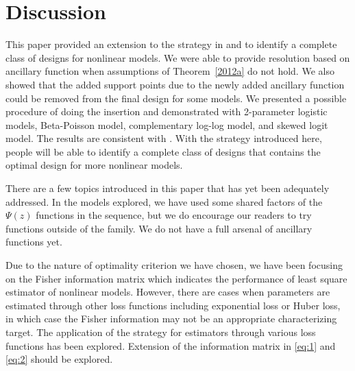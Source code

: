 \documentclass[11pt]{amsart}
\theoremstyle{definition}
\theoremstyle{remark}
\numberwithin{equation}{section}
\begin{document}
    \section{Discussion}
 This paper provided an extension to the strategy in \cite{yang2010} and \cite{yang2012} to identify a complete class of designs for nonlinear models. We were able to provide resolution based on ancillary function when assumptions of Theorem~\ref{2012a} do not hold. We also showed that the added support points due to the newly added ancillary function could be removed from the final design for some models. We presented a possible procedure of doing the insertion and demonstrated with 2-parameter logistic models, Beta-Poisson model, complementary log-log model, and skewed logit model. The results are consistent with \cite{biedermann2006}. With the strategy introduced here, people will be able to identify a complete class of designs that contains the optimal design for more nonlinear models.
 
There are a few topics introduced in this paper that has yet been adequately addressed. In the models explored, we have used some shared factors of the $\Psi(z)$ functions in the sequence, but we do encourage our readers to try functions outside of the family. We do not have a full arsenal of ancillary functions yet.

Due to the nature of optimality criterion we have chosen, we have been focusing on the Fisher information matrix which indicates the performance of least square estimator of nonlinear models. However, there are cases when parameters are estimated through other loss functions including exponential loss or Huber loss, in which case the Fisher information may not be an appropriate characterizing target. The application of the strategy for estimators through various loss functions has been explored. Extension of the information matrix in \eqref{eq:1} and \eqref{eq:2} should be explored.\


 
\nocite{*}
%

 
\end{document}
